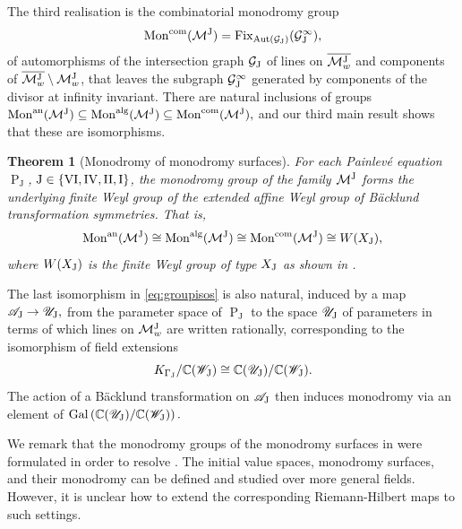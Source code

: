 \documentclass[a4paper,reqno]{amsart}
\numberwithin{equation}{section}
\newcommand{\C}{\mathbb{C}}
\newcommand{\pain}[1]{\operatorname{P}_{\mathrm{#1}}}
\newtheorem{maintheorem}{Theorem}
\numberwithin{equation}{section}
\begin{document}
The third realisation is the combinatorial monodromy group
$$\operatorname{Mon}^{\operatorname{com}} (\mathcal{M}^{\rm{J}}) = \operatorname{Fix}_{\operatorname{Aut}(\mathcal{G}_{\rm{J}})} (\mathcal{G}_{\rm{J}}^{\infty}),$$
of automorphisms of the intersection graph $\mathcal{G}_{\rm{J}}$ of lines on $\overline{\mathcal{M}^{\rm{J}}_w}$ and components of $\overline{\mathcal{M}_w^{\rm{J}}}\setminus \mathcal{M}_w^{\rm{J}} $, that leaves the subgraph $\mathcal{G}_{\rm{J}}^{\infty}$ generated by components of the divisor at infinity invariant.
There are natural inclusions of groups
$ \operatorname{Mon}^{\operatorname{an}}(\mathcal{M}^{\rm{J}}) \subseteq \operatorname{Mon}^{\operatorname{alg}}(\mathcal{M}^{\rm{J}}) \subseteq  \operatorname{Mon}^{\operatorname{com}}(\mathcal{M}^{\rm{J}}),$
and our third main result shows that these are isomorphisms.
\begin{maintheorem}[Monodromy of monodromy surfaces] \label{mainthm:mon}
For each Painlev\'e equation $\pain{J}$, $\rm{J}\in \{\rm{VI},\rm{IV},\rm{II},\rm{I}\}$, the monodromy group of the family $\mathcal{M}^{\rm{J}}$ forms the underlying finite Weyl group of the extended affine Weyl group of B\"acklund transformation symmetries.
That is, 
\begin{equation}\label{eq:groupisos}
    \begin{gathered}
    \operatorname{Mon}^{\operatorname{an}}(\mathcal{M}^{\rm{J}}) \cong \operatorname{Mon}^{\operatorname{alg}}(\mathcal{M}^{\rm{J}}) \cong \operatorname{Mon}^{\operatorname{com}}(\mathcal{M}^{\rm{J}})\cong W(X_{\rm{J}}), 
\end{gathered}
\end{equation}
where $W(X_{\rm{J}})$ is the finite Weyl group of type $X_{\rm{J}}$ as shown in .
\end{maintheorem}
The last isomorphism in \eqref{eq:groupisos} is also natural, induced by a map 
$\mathscr{A}_{\rm{J}} \to \mathscr{U}_{\rm{J}}, $
from the parameter space of $\pain{J}$ to  the space $\mathscr{U}_{\rm{J}}$ of parameters in terms of which lines on $\mathcal{M}_w^{\rm{J}}$ are written rationally, corresponding to the isomorphism of field extensions 
$$K_{\Gamma_{\rm{J}}}/ \C(\mathscr{W}_{\rm{J}}) \cong \C(\mathscr{U}_{\rm{J}})/\C(\mathscr{W}_{\rm{J}}).$$
The action of a B\"acklund transformation on $\mathscr{A}_{\rm{J}}$ then induces monodromy via an element of $\operatorname{Gal}\left(\C(\mathscr{U}_{\rm{J}})/\C(\mathscr{W}_{\rm{J}})\right).$

We remark that the monodromy groups of the monodromy surfaces in  were formulated in order to resolve . The initial value spaces, monodromy surfaces, and their monodromy can be defined and studied over more general fields. 
However, it is unclear how to extend the corresponding Riemann-Hilbert maps to such settings.
\end{document}
